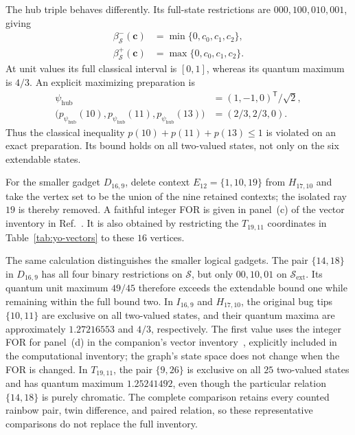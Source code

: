 \documentclass[aps,pra,reprint,superscriptaddress,longbibliography,nofootinbib,floatfix,10pt]{revtex4-2}
\theoremstyle{definition}\newtheorem{definition}[theorem]{Definition}
\theoremstyle{remark}\newtheorem{remark}[theorem]{Remark}
\newcommand{\Sc}{\mathcal S}\newcommand{\Cc}{\mathcal C}\newcommand{\Wc}{\mathcal W}
\begin{document}
The hub triple behaves differently. Its full-state restrictions are $000,100,010,001$, giving
\begin{equation}\label{eq:classical-hub-envelope}
\begin{aligned}
\beta^-_{\Sc}(\mathbf c)&=\min\{0,c_0,c_1,c_2\},\\
\beta^+_{\Sc}(\mathbf c)&=\max\{0,c_0,c_1,c_2\}.
\end{aligned}
\end{equation}
At unit values its full classical interval is $[0,1]$, whereas its quantum maximum is $4/3$. An explicit maximizing preparation is
\begin{equation}\label{eq:H21-hub-explicit-witness}
\begin{aligned}
\psi_{\mathrm{hub}}&=(1,-1,0)^{\mathsf T}/\sqrt2,\\
\bigl(p_{\psi_{\mathrm{hub}}}(10),p_{\psi_{\mathrm{hub}}}(11),p_{\psi_{\mathrm{hub}}}(13)\bigr)
&=(2/3,2/3,0).
\end{aligned}
\end{equation}
Thus the classical inequality $p(10)+p(11)+p(13)\le1$ is violated on an exact preparation. Its bound holds on all two-valued states, not only on the six extendable states.

For the smaller gadget $D_{16,9}$, delete context $E_{12}=\{1,10,19\}$ from $H_{17,10}$ and take the vertex set to be the union of the nine retained contexts; the isolated ray $19$ is thereby removed. A faithful integer FOR is given in panel~(c) of the vector inventory in Ref.~\cite{supplement}. It is also obtained by restricting the $T_{19,11}$ coordinates in Table~\ref{tab:yo-vectors} to these $16$ vertices.

The same calculation distinguishes the smaller logical gadgets. The pair $\{14,18\}$ in $D_{16,9}$ has all four binary restrictions on $\Sc$, but only $00,10,01$ on $\Sc_{\mathrm{ext}}$. Its quantum unit maximum $49/45$ therefore exceeds the extendable bound one while remaining within the full bound two. In $I_{16,9}$ and $H_{17,10}$, the original bug tips $\{10,11\}$ are exclusive on all two-valued states, and their quantum maxima are approximately $1.27216553$ and $4/3$, respectively. The first value uses the integer FOR for panel~(d) in the companion's vector inventory~\cite{supplement}, explicitly included in the computational inventory; the graph's state space does not change when the FOR is changed. In $T_{19,11}$, the pair $\{9,26\}$ is exclusive on all $25$ two-valued states and has quantum maximum $1.25241492$, even though the particular relation $\{14,18\}$ is purely chromatic. The complete comparison retains every counted rainbow pair, twin difference, and paired relation, so these representative comparisons do not replace the full inventory.
\end{document}

